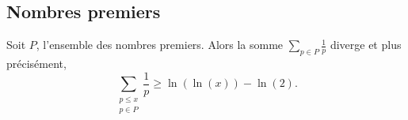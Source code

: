 \subsection{Nombres premiers}

\begin{theorem} \label{ThonfVruT}
    Soit \( P\), l'ensemble des nombres premiers. Alors la somme \( \sum_{p\in P}\frac{1}{ p }\) diverge et plus précisément,
    \begin{equation}
        \sum_{\substack{p\leq x\\p\in P}}\frac{1}{ p }\geq \ln(\ln(x))-\ln(2).
    \end{equation}
\end{theorem}

